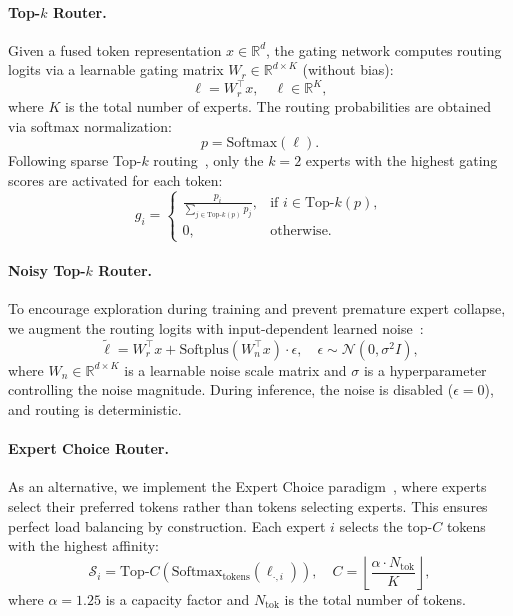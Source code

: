\paragraph{Top-$k$ Router.} Given a fused token representation $x \in \mathbb{R}^d$, the gating network computes routing logits via a learnable gating matrix $W_r \in \mathbb{R}^{d \times K}$ (without bias):
\begin{equation}
    \ell = W_r^\top x, \quad \ell \in \mathbb{R}^K,
    \label{eq:routing_logits}
\end{equation}
where $K$ is the total number of experts. The routing probabilities are obtained via softmax normalization:
\begin{equation}
    p = \text{Softmax}(\ell).
    \label{eq:routing_probs}
\end{equation}
Following sparse Top-$k$ routing~\cite{shazeer2017outrageously}, only the $k = 2$ experts with the highest gating scores are activated for each token:
\begin{equation}
    g_i = 
    \begin{cases}
        \frac{p_i}{\sum_{j \in \text{Top-}k(p)} p_j}, & \text{if } i \in \text{Top-}k(p), \\
        0, & \text{otherwise}.
    \end{cases}
    \label{eq:topk_gate}
\end{equation}

\paragraph{Noisy Top-$k$ Router.} To encourage exploration during training and prevent premature expert collapse, we augment the routing logits with input-dependent learned noise~\cite{shazeer2017outrageously}:
\begin{equation}
    \tilde{\ell} = W_r^\top x + \text{Softplus}(W_n^\top x) \cdot \epsilon, \quad \epsilon \sim \mathcal{N}(0, \sigma^2 I),
    \label{eq:noisy_routing}
\end{equation}
where $W_n \in \mathbb{R}^{d \times K}$ is a learnable noise scale matrix and $\sigma$ is a hyperparameter controlling the noise magnitude. During inference, the noise is disabled ($\epsilon = 0$), and routing is deterministic.

\paragraph{Expert Choice Router.} As an alternative, we implement the Expert Choice paradigm~\cite{zhou2022mixture}, where experts select their preferred tokens rather than tokens selecting experts. This ensures perfect load balancing by construction. Each expert $i$ selects the top-$C$ tokens with the highest affinity:
\begin{equation}
    \mathcal{S}_i = \text{Top-}C\!\left(\text{Softmax}_{\text{tokens}}(\ell_{\cdot, i})\right), \quad C = \left\lfloor \frac{\alpha \cdot N_{\text{tok}}}{K} \right\rfloor,
\end{equation}
where $\alpha = 1.25$ is a capacity factor and $N_{\text{tok}}$ is the total number of tokens.

